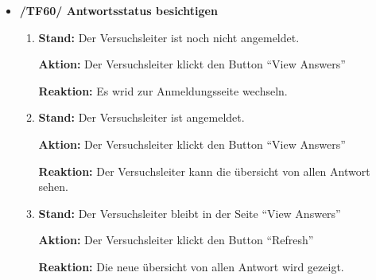 \documentclass[a4paper]{scrreprt}
\begin{document}
\begin{itemize}
\begin{enumerate}
                    \end{enumerate}


                \item \textbf{/TF60/ Antwortsstatus besichtigen}
                    \begin{enumerate}
                        \item \par \textbf{Stand: } Der \gls{Versuchsleiter} ist noch nicht angemeldet.
                              \par \textbf{Aktion: } Der \gls{Versuchsleiter} klickt den Button ``View Answers''
                              \par \textbf{Reaktion: } Es wrid zur Anmeldungsseite wechseln.

                        \item \par \textbf{Stand: } Der \gls{Versuchsleiter} ist angemeldet.
                              \par \textbf{Aktion: } Der \gls{Versuchsleiter} klickt den Button ``View Answers''
                              \par \textbf{Reaktion: } Der \gls{Versuchsleiter} kann die \"ubersicht von allen Antwort sehen.

                        \item \par \textbf{Stand: } Der \gls{Versuchsleiter} bleibt in der Seite ``View Answers''
                              \par \textbf{Aktion: } Der \gls{Versuchsleiter} klickt den Button ``Refresh''
                              \par \textbf{Reaktion: } Die neue \"ubersicht von allen Antwort wird gezeigt.


\end{enumerate}
\end{itemize}
\end{document}
